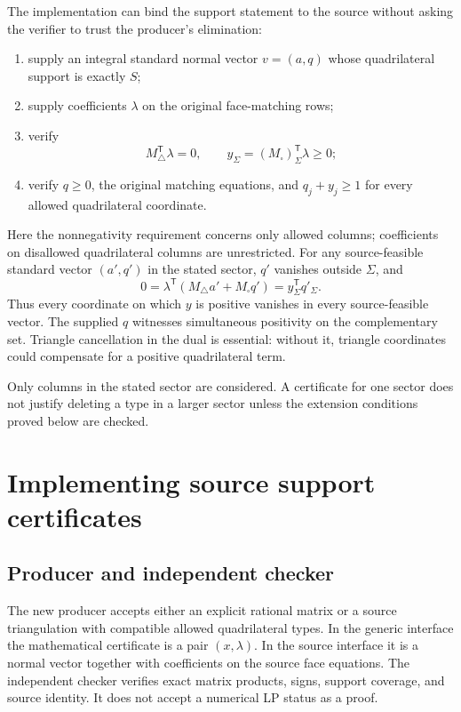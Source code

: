 \documentclass[11pt]{article}
\theoremstyle{definition}
\theoremstyle{remark}
\begin{document}
The implementation can bind the support statement to the source without
asking the verifier to trust the producer's elimination:
\begin{enumerate}
\item supply an integral standard normal vector \(v=(a,q)\) whose
quadrilateral support is exactly \(S\);
\item supply coefficients \(\lambda\) on the original face-matching rows;
\item verify
\[
M_\triangle^{\mathsf T}\lambda=0,\qquad
y_\Sigma=(M_\square)_\Sigma^{\mathsf T}\lambda\geq0;
\]
\item verify \(q\geq0\), the original matching equations, and
\(q_j+y_j\geq1\) for every allowed quadrilateral coordinate.
\end{enumerate}
Here the nonnegativity requirement concerns only allowed columns; coefficients
on disallowed quadrilateral columns are unrestricted. For any source-feasible
standard vector \((a',q')\) in the stated sector, \(q'\) vanishes outside
\(\Sigma\), and
\[
0=\lambda^{\mathsf T}(M_\triangle a'+M_\square q')
  =y_\Sigma^{\mathsf T}q'_\Sigma.
\]
Thus every coordinate on which \(y\) is positive vanishes in every
source-feasible vector. The supplied \(q\) witnesses simultaneous positivity
on the complementary set. Triangle cancellation in the dual is essential:
without it, triangle coordinates could compensate for a positive
quadrilateral term.

Only columns in the stated sector are considered. A certificate for one
sector does not justify deleting a type in a larger sector unless the
extension conditions proved below are checked.



\section{Implementing source support certificates}
\label{sec:support-implementation}

\subsection{Producer and independent checker}

The new producer accepts either an explicit rational matrix or a source
triangulation with compatible allowed quadrilateral types. In the generic
interface the mathematical certificate is a pair \((x,\lambda)\).
In the source interface it is a normal vector together with coefficients
on the source face equations. The independent checker verifies exact
matrix products, signs, support coverage, and source identity. It does not
accept a numerical LP status as a proof.
\end{document}

